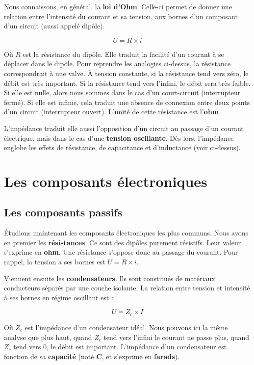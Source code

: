 \documentclass[
]{book}
\begin{document}
Nous connaissons, en général, la \textbf{loi d'Ohm}. Celle-ci permet de donner une relation entre l'intensité du courant et sa tension, aux bornes d'un composant d'un circuit (aussi appelé dipôle).

\[ U = R \times i \]

Où \(R\) est la résistance du dipôle. Elle traduit la facilité d'un courant à se déplacer dans le dipôle. Pour reprendre les analogies ci-dessus, la résistance correspondrait à une valve. À tension constante, si la résistance tend vers zéro, le débit est très important. Si la résistance tend vers l'infini, le débit sera très faible. Si elle est nulle, alors nous sommes dans le cas d'un court-circuit (interrupteur fermé). Si elle est infinie, cela traduit une absence de connexion entre deux points d'un circuit (interrupteur ouvert). L'unité de cette résistance est l'\textbf{ohm}.

L'impédance traduit elle aussi l'opposition d'un circuit au passage d'un courant électrique, mais dans le cas d'une \textbf{tension oscillante}. Dès lors, l'impédance englobe les effets de résistance, de capacitance et d'inductance (voir ci-dessus).

\hypertarget{les-composants-uxe9lectroniques}{%
\section{Les composants électroniques}\label{les-composants-uxe9lectroniques}}

\hypertarget{les-composants-passifs}{%
\subsection{Les composants passifs}\label{les-composants-passifs}}

Étudions maintenant les composants électroniques les plus communs. Nous avons en premier les \textbf{résistances}. Ce sont des dipôles purement résistifs. Leur valeur s'exprime en \textbf{ohm}. Une résistance s'oppose donc au passage du courant. Pour rappel, la tension a ses bornes est \(U = R \times i\).

Viennent ensuite les \textbf{condensateurs}. Ils sont constitués de matériaux conducteurs séparés par une couche isolante. La relation entre tension et intensité à ses bornes en régime oscillant est :

\[ U = Z_c \times I \]

Où \(Z_c\) est l'impédance d'un condensateur idéal. Nous pouvons ici la même analyse que plus haut, quand \(Z_c\) tend vers l'infini le courant ne passe plus, quand \(Z_c\) tend vers 0, le débit est important. L'impédance d'un condensateur est fonction de sa \textbf{capacité} (noté \textbf{C}, et s'exprime en \textbf{farads}).
\end{document}
